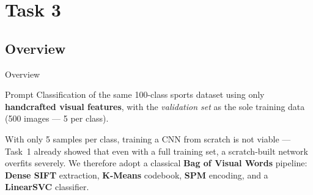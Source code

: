 \section{Task 3}
\makeatletter{}\makeatother\label{sec:task3}

\subsection{Overview}
\begin{frame}{Overview}
  \begin{block}{Prompt}
    Classification of the same 100-class sports dataset using only \textbf{handcrafted visual features}, with the \textit{validation set} as the sole training data (500 images — 5 per class).
  \end{block}
  \vspace{\baselineskip}
  With only 5 samples per class, training a CNN from scratch is not viable — Task~1 already showed that even with a full training set, a scratch-built network overfits severely.
  We therefore adopt a classical \textbf{Bag of Visual Words} pipeline: \textbf{Dense SIFT} extraction, \textbf{K-Means} codebook, \textbf{SPM} encoding, and a \textbf{LinearSVC} classifier.
\end{frame}


